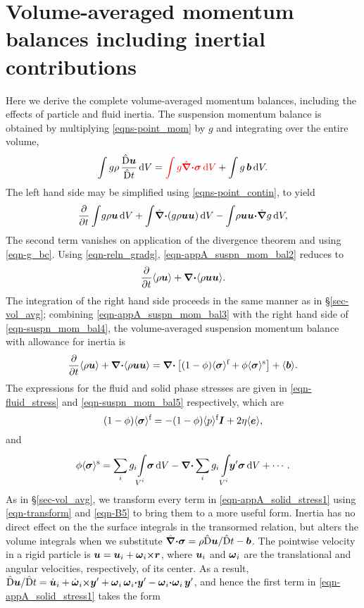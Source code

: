 \documentclass[aip,pof,preprint]{report}
\newcommand{\te}[1]{\mbox{\boldmath $#1$}}
\newcommand{\Frac}[2]{\frac{\displaystyle #1}{\displaystyle #2}}
\newcommand{\be}{\begin{equation}}
\newcommand{\ee}{\end{equation}}
\newcommand{\Div}{\te{\nabla \cdot}}
\newcommand{\Grad}{\te{\nabla}}
\newcommand{\pder}[2]{\frac{\displaystyle\partial#1}{\displaystyle\partial#2}}
\newcommand{\bdot}{\te{\cdot}}
\newcommand{\avg}[1]{\langle #1 \rangle}
\newcommand{\subtext}[1]{\mbox{\scriptsize #1}}
\newcommand{\varint}[2]{\int\limits_{\mbox{\scriptsize $#1$}}^{\mbox{\scriptsize $#2$}}\!}
\newcommand{\dup}{{\mathrm d}}
\newcommand{\matderivhat}[1]{\Frac{\hat{\mathrm D} #1}{\hat{\mathrm D} t}}
\newcommand{\cross}[2]{#1 \mbox{\small \te{\times}} #2}
\newcommand{\Gradhat}{\hat{\Grad}}
\newcommand{\Divhat}{\Gradhat \bdot}
\newcommand{\sigmas}{\avg{\te{\sigma}}^{\subtext{s}}}
\newcommand{\sigmaf}{\avg{\te{\sigma}}^{\subtext{f}}}
\begin{document}
\appendix

\section{Volume-averaged momentum balances including inertial contributions}
\label{sec-appA}

	Here we derive the complete volume-averaged momentum balances, including the effects of particle and fluid inertia.  The suspension momentum balance is obtained by multiplying \eqref{eqns-point_mom} by $g$ and integrating over the entire volume,
\be
	\int g \rho \, \matderivhat{\te{u}} \, \dup V = {\color{red} \int g \Divhat \te{\sigma} \, \dup V} + \int g\, \te{b} \, \dup V.
\label{eqn-appA_suspn_mom_bal1}
\ee
The left hand side may be simplified using \eqref{eqns-point_contin}, to yield
\be
	\pder{}{t} \int \!  g \rho \te{u} \, \dup V + \int \! \Divhat ( g \rho \te{u} \te{u}) \, \dup V - \int \! \rho \te{u} \te{u} \bdot \Gradhat g \, \dup V,
\label{eqn-appA_suspn_mom_bal2}
\ee
The second term vanishes on application of the divergence theorem and using \eqref{eqn-g_bc}.  Using \eqref{eqn-reln_gradg}, \eqref{eqn-appA_suspn_mom_bal2} reduces to
\be
	\pder{}{t} \avg{\rho \te{u}} + \Div \avg{\rho \te{u u}}.
\label{eqn-appA_suspn_mom_bal3}
\ee
The integration of the right hand side proceeds in the same manner as in \S \ref{sec-vol_avg}; combining \eqref{eqn-appA_suspn_mom_bal3} with the right hand side of \eqref{eqn-suspn_mom_bal4}, the volume-averaged suspension momentum balance with allowance for inertia is
\be
	\pder{}{t} \avg{\rho \te{u}} + \Div \avg{\rho \te{u u}} = \Div \left[(1-\phi) \sigmaf + \phi \sigmas \right]  + \avg{\te{b}}.
\label{eqn-appA_suspn_mom_bal4}
\ee
The expressions for the fluid and solid phase stresses are given in \eqref{eqn-fluid_stress} and \eqref{eqn-suspn_mom_bal5} respectively, which are
\be
	(1-\phi) \sigmaf = - (1-\phi) \avg{p}^{\subtext{f}} \te{I} + 2 \eta \avg{\te{e}},
\label{eqn-appA_fluid_stress}
\ee
and
\be
	\phi \sigmas = \sum_{i} g_i \! \varint{V^i}{} \te{\sigma} \, \dup V -  \Grad \bdot \sum_{i} g_i \varint{V^i}{} \! \te{y}' \te{\sigma} \, \dup V + \cdots.
\label{eqn-appA_solid_stress1}
\ee
As in \S \ref{sec-vol_avg}, we transform every term in \eqref{eqn-appA_solid_stress1} using \eqref{eqn-transform} and \eqref{eqn-B5} to bring them to a more useful form.  Inertia has no direct effect on the the surface integrals in the transormed relation, but alters the volume integrals when we substitute $\Divhat \te{\sigma} = \rho \hat{\mathrm{D}} \te{u}/\hat{\mathrm{D}} t - \te{b}$.  The pointwise velocity in a rigid particle is $\te{u} = \te{u}_i + \cross{\te{\omega}_i}{\te{r}}$, where $\te{u}_i$ and $\te{\omega}_i$ are the translational and angular velocities, respectively, of its center.  As a result, $\hat{\mathrm{D}} \te{u}/\hat{\mathrm{D}} t = \dot{\te{u}}_i + \cross{\dot{\te{\omega}}_i}{\te{y}'} + \te{\omega}_i \,\te{\omega}_i \bdot \te{y}' - \te{\omega}_i\bdot \te{\omega}_i \, \te{y}'$, and hence the first term in \eqref{eqn-appA_solid_stress1} takes the form
\end{document}
